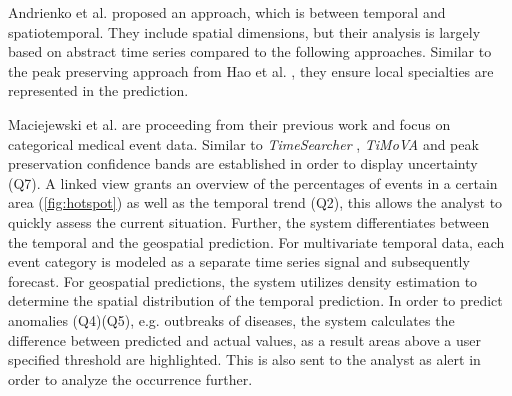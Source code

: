 \documentclass[electronic]{vgtc}             %
\begin{document}
Andrienko et al. \cite{Andrienko:2010} proposed an approach, which is between temporal and spatiotemporal. 
They include spatial dimensions, but their analysis is largely based on abstract time series compared to the following approaches.
Similar to the peak preserving approach from Hao et al. \cite{Hao:2012}, they ensure local specialties are represented in the prediction. 

Maciejewski et al. \cite{maciejewski:2011} are proceeding from their previous work \cite{maciejewski:2008, maciejewski:2007} and focus on categorical medical event data.
Similar to \textit{TimeSearcher} \cite{buono:2007}, \textit{TiMoVA} \cite{boegl:2013} and peak preservation \cite{Hao:2012} confidence bands are established in order to display uncertainty (Q7).
A linked view grants an overview of the percentages of events in a certain area (\autoref{fig:hotspot}) as well as the temporal trend (Q2), this allows the analyst to quickly assess the current situation.
Further, the system differentiates between the temporal and the geospatial prediction.
For multivariate temporal data, each event category is modeled as a separate time series signal and subsequently forecast. 
For geospatial predictions, the system utilizes density estimation to determine the spatial distribution of the temporal prediction. 
In order to predict anomalies (Q4)(Q5), e.g. outbreaks of diseases, the system calculates the difference between predicted and actual values, as a result areas above a user specified threshold are highlighted.
This is also sent to the analyst as alert in order to analyze the occurrence further.
\end{document}
